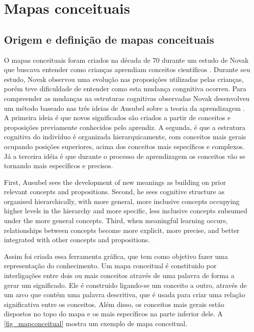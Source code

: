 \documentclass[
	12pt,				%
	openright,			%
	oneside,			%
	a4paper,			%
	english,			%
	french,				%
	spanish,			%
	brazil				%
	]{abntex2}
\begin{document}
\chapter{Mapas conceituais}
\section{Origem e definição de mapas conceituais}
O mapas conceituais foram criados na década de 70 durante um estudo de Novak que buscava entender como crianças aprendiam conceitos científicos \cite{Novak2005}. Durante seu estudo, Novak observou uma evolução nas proposições utilizadas pelas crianças, porém teve dificuldade de entender como esta mudança congnitiva ocorreu. Para compreender as mudanças na estruturas cognitivas observadas Novak desenvolveu um método baseado nas três ideias de Ausubel sobre a teoria da aprendizagem \cite{ausubel1963}. A primeira ideia é que novos significados são criados a partir de conceitos e proposições previamente conhecidos pelo aprendiz. A segunda, é que a estrutura cognitiva do indivíduo é organizada hierarquicamente, com conceitos mais gerais ocupando posições superiores, acima dos conceitos mais específicos e complexos. Já a terceira idéia é que durante o processo de aprendizagem os conceitos vão se tornando mais específicos e precisos.

\begin{citacao}[english]
	First, Ausubel sees the development
	of new meanings as building on prior relevant concepts and propositions. Second,
	he sees cognitive structure as organised hierarchically, with more general, more inclusive concepts occupying higher levels in the hierarchy and more specific, less
	inclusive concepts subsumed under the more general concepts. Third, when meaningful learning occurs, relationships between concepts become more explicit, more
	precise, and better integrated with other concepts and propositions\cite{Novak2005}.
\end{citacao}

Assim foi criada essa ferramenta gráfica, que tem como objetivo fazer uma representação do conhecimento. Um mapa conceitual é constituido por interligações entre dois ou mais conceitos através de uma palavra de forma a gerar um significado. Ele é construido ligando-se um conceito a outro, através de um arco que contém uma palavra descritiva, que é usada para criar uma relação significativa entre os conceitos. Além disso, os conceitos mais gerais estão dispostos no topo do mapa e os mais específicos na parte inferior dele. A \autoref{fig_mapconceitual} mostra um exemplo de mapa conceitual.
\end{document}

